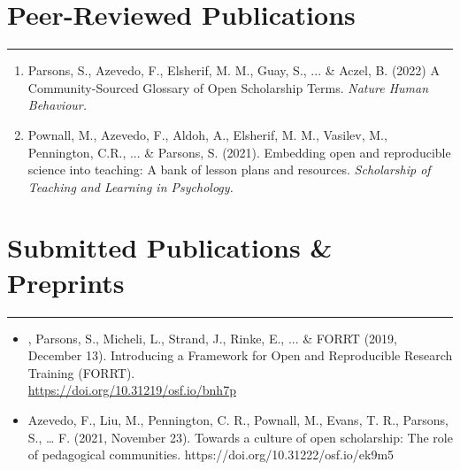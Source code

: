 \documentclass[letterpaper]{article}
\begin{document}
\section*{\color{Brown}Peer-Reviewed Publications}
\vspace{-.5em}
\hrule
\vspace{1em}
\begin{enumerate}


\item[]{\noindent Parsons, S., {Azevedo, F.}, Elsherif, M. M., Guay, S., ... \& Aczel, B. (2022) A Community-Sourced Glossary of Open Scholarship Terms. \it{Nature Human Behaviour}.} {}

\item[]{\noindent Pownall, M., {Azevedo, F.},  Aldoh, A., Elsherif, M. M.,  Vasilev, M., Pennington, C.R., ... \& Parsons, S. (2021). Embedding open and reproducible science into teaching: A bank of lesson plans and resources. \it{Scholarship of Teaching and Learning in Psychology}. {}}




\vspace{0.25em}

\end{enumerate}


\section*{\color{Brown}Submitted Publications \& Preprints}
\vspace{-.5em}
\hrule
\vspace{1em}
\begin{itemize}
\vspace{0.25em}

\item[]{, Parsons, S., Micheli, L., Strand, J., Rinke, E., ... \& FORRT (2019, December 13). Introducing a Framework for Open and Reproducible Research Training (FORRT). \\                               \href{https://doi.org/10.31219/osf.io/bnh7p}{\color{BlueViolet}https://doi.org/10.31219/osf.io/bnh7p} {}}


\item[]{\noindent Azevedo, F., Liu, M., Pennington, C. R., Pownall, M., Evans, T. R., Parsons, S., … F. (2021, November 23). Towards a culture of open scholarship: The role of pedagogical communities. https://doi.org/10.31222/osf.io/ek9m5}


\end{itemize}
\end{document}
